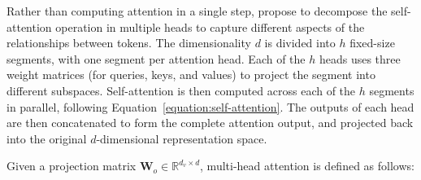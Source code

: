 Rather than computing attention in a single step, \citet{vaswani2017attention} propose to decompose the self-attention operation in multiple heads to capture different aspects of the relationships between tokens. The dimensionality $d$ is divided into $h$ fixed-size segments, with one segment per attention head. Each of the $h$ heads uses three weight matrices (for queries, keys, and values) to project the segment into different subspaces. Self-attention is then computed across each of the $h$ segments in parallel, following Equation~\ref{equation:self-attention}. The outputs of each head are then concatenated to form the complete attention output, and projected back into the original $d$-dimensional representation space.





Given a projection matrix $\bm{W}_o \in \mathbb{R}^{d_v \times d}$, multi-head attention is defined as follows:


